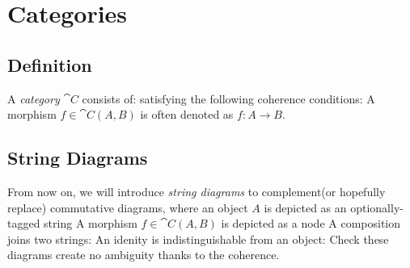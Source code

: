 
\section{Categories}

\subsection{Definition}

A \textit{category} $\cat{C}$ consists of:
satisfying the following coherence conditions:
A morphism $f \in \cat{C}(A,B)$ is often denoted as
$
    f : A \to B
$.


\subsection{String Diagrams}

From now on, we will introduce \textit{string diagrams} %
to complement(or hopefully replace) commutative diagrams, where an object $A$ %
is depicted as an optionally-tagged string
A morphism $f \in \cat{C}(A,B)$ is depicted as a node
A composition joins two strings:
An idenity is indistinguishable from an object:
Check these diagrams create no ambiguity thanks to the coherence.


